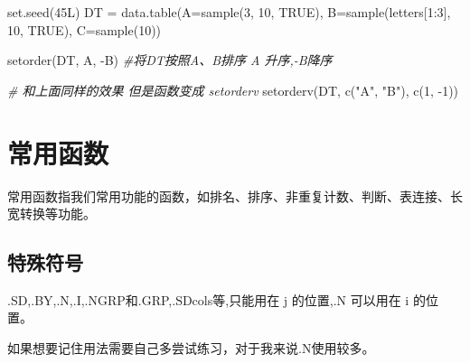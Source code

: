 \documentclass[
]{book}
\newenvironment{Shaded}{\begin{snugshade}}{\end{snugshade}}
\newcommand{\AttributeTok}[1]{\textcolor[rgb]{0.77,0.63,0.00}{#1}}
\newcommand{\CommentTok}[1]{\textcolor[rgb]{0.56,0.35,0.01}{\textit{#1}}}
\newcommand{\ConstantTok}[1]{\textcolor[rgb]{0.00,0.00,0.00}{#1}}
\newcommand{\DecValTok}[1]{\textcolor[rgb]{0.00,0.00,0.81}{#1}}
\newcommand{\FunctionTok}[1]{\textcolor[rgb]{0.00,0.00,0.00}{#1}}
\newcommand{\NormalTok}[1]{#1}
\newcommand{\OtherTok}[1]{\textcolor[rgb]{0.56,0.35,0.01}{#1}}
\newcommand{\SpecialCharTok}[1]{\textcolor[rgb]{0.00,0.00,0.00}{#1}}
\newcommand{\StringTok}[1]{\textcolor[rgb]{0.31,0.60,0.02}{#1}}
\begin{document}
\begin{Shaded}
\begin{Highlighting}[]
\FunctionTok{set.seed}\NormalTok{(45L)}
\NormalTok{DT }\OtherTok{=} \FunctionTok{data.table}\NormalTok{(}\AttributeTok{A=}\FunctionTok{sample}\NormalTok{(}\DecValTok{3}\NormalTok{, }\DecValTok{10}\NormalTok{, }\ConstantTok{TRUE}\NormalTok{),}
         \AttributeTok{B=}\FunctionTok{sample}\NormalTok{(letters[}\DecValTok{1}\SpecialCharTok{:}\DecValTok{3}\NormalTok{], }\DecValTok{10}\NormalTok{, }\ConstantTok{TRUE}\NormalTok{), }\AttributeTok{C=}\FunctionTok{sample}\NormalTok{(}\DecValTok{10}\NormalTok{))}

\FunctionTok{setorder}\NormalTok{(DT, A, }\SpecialCharTok{{-}}\NormalTok{B) }\CommentTok{\#将DT按照A、B排序 A 升序,{-}B降序}

\CommentTok{\# 和上面同样的效果 但是函数变成 setorderv}
\FunctionTok{setorderv}\NormalTok{(DT, }\FunctionTok{c}\NormalTok{(}\StringTok{"A"}\NormalTok{, }\StringTok{"B"}\NormalTok{), }\FunctionTok{c}\NormalTok{(}\DecValTok{1}\NormalTok{, }\SpecialCharTok{{-}}\DecValTok{1}\NormalTok{))}
\end{Highlighting}
\end{Shaded}

\hypertarget{ux5e38ux7528ux51fdux6570}{%
\section{常用函数}\label{ux5e38ux7528ux51fdux6570}}

常用函数指我们常用功能的函数，如排名、排序、非重复计数、判断、表连接、长宽转换等功能。

\hypertarget{ux7279ux6b8aux7b26ux53f7}{%
\subsection{特殊符号}\label{ux7279ux6b8aux7b26ux53f7}}

.SD,.BY,.N,.I,.NGRP和.GRP,.SDcols等,只能用在 j 的位置,.N 可以用在 i 的位置。

如果想要记住用法需要自己多尝试练习，对于我来说.N使用较多。
\end{document}
